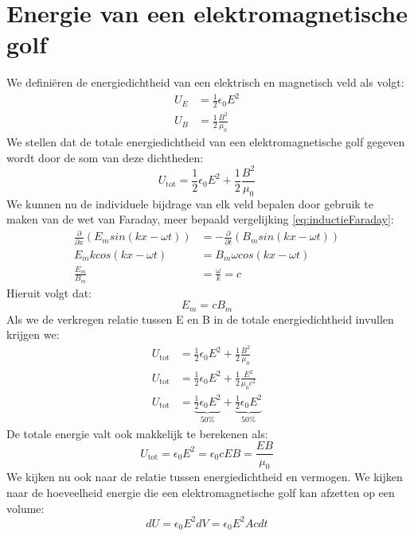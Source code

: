 \documentclass[a4paper,kul]{kulakarticle} %
\begin{document}
\section{Energie van een elektromagnetische golf}
We definiëren de energiedichtheid van een elektrisch en magnetisch veld als volgt: 
\begin{align*}
	U_E&=\frac{1}{2}\epsilon_0E^2\\
	U_B&=\frac{1}{2}\frac{B^2}{\mu_0}
\end{align*}
We stellen dat de totale energiedichtheid van een elektromagnetische golf gegeven wordt door de som van deze dichtheden:
\begin{equation*}
	U_{\text{tot}} = \frac{1}{2}\epsilon_0E^2+\frac{1}{2}\frac{B^2}{\mu_0}
\end{equation*}
We kunnen nu de individuele bijdrage van elk veld bepalen door gebruik te maken van de wet van Faraday, meer bepaald vergelijking \ref{eq:inductieFaraday}:
\begin{align*}
	\frac{\partial}{\partial x}(E_msin(kx-\omega t)) &=-\frac{\partial}{\partial t}(B_msin(kx-\omega t))\\
	E_mkcos(kx-\omega t) &= B_m\omega cos(kx-\omega t)\\
	\frac{E_m}{B_m} &= \frac{\omega}{k} = c
\end{align*}
Hieruit volgt dat:
\begin{equation*}
	E_m=cB_m
\end{equation*}
Als we de verkregen relatie tussen E en B in de totale energiedichtheid invullen krijgen we:
\begin{align*}
	U_{\text{tot}} &= \frac{1}{2}\epsilon_0E^2+\frac{1}{2}\frac{B^2}{\mu_0}\\
	U_{\text{tot}} &= \frac{1}{2}\epsilon_0E^2+\frac{1}{2}\frac{E^2}{\mu_0c^2}\\
	U_{\text{tot}} &= \underbrace{\frac{1}{2}\epsilon_0E^2}_{\text{50\%}}+\underbrace{\frac{1}{2}\epsilon_0E^2}_{\text{50\%}}
\end{align*}
De totale energie valt ook makkelijk te berekenen als:
\begin{equation*}
	U_{\text{tot}}=\epsilon_0E^2=\epsilon_0cEB = \frac{EB}{\mu_0}
\end{equation*}
We kijken nu ook naar de relatie tussen energiedichtheid en vermogen. We kijken naar de hoeveelheid energie die een elektromagnetische golf kan afzetten op een volume:
\begin{equation*}
	dU = \epsilon_0E^2dV=\epsilon_0E^2Acdt
\end{equation*}
\end{document}
